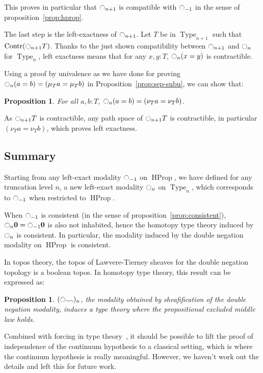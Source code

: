 \documentclass[conference]{IEEEtran}
\newtheorem{prop}[thm]{Proposition}
\DeclareMathOperator{\Type}{Type}
\DeclareMathOperator{\HProp}{HProp}
\DeclareMathOperator{\Contr}{Contr}
\newcommand{\modal}{\ensuremath{\ocircle}}
\newcommand \zero {\mathbf{0}}
\begin{document}
This proves in particular that $\modal_{n+1}$ is compatible with
$\modal_{-1}$ in the sense of proposition~\ref{prop:hprop}.

The last step is the left-exactness of $\modal_{n+1}$. Let $T$ be in
$\Type_{n+1}$ such that $\Contr(\modal_{n+1} T)$.  Thanks to the just
shown compatibility between $\modal_{n+1}$ and $\modal_n$ for
$\Type_n$, left exactness means that for any $x,y : T$,
$\modal_n(x=y)$ is contractible.

Using a proof by univalence as we have done for proving $\modal_n (a=b) = (\mu_T a =
\mu_T b)$ in Proposition~\ref{prop:sep-subu}, we can show that:
\begin{prop}
  For all $a,b:T$, $\modal_n(a=b) = (\nu_T a = \nu_T b)$.
\end{prop}

As $\modal_{n+1} T$ is contractible, any path space of $\modal_{n+1} T$ is
contractible, in particular $(\nu_T a=\nu_T b)$, which proves left
exactness. 

\subsection{Summary}
\label{ssec:summary}

Starting from any left-exact modality $\modal_{-1}$ on $\HProp$, we
have defined for any truncation level $n$, a new left-exact modality
$\modal_n$ on $\Type_n$, which corresponds to $\modal_{-1}$ when
restricted to $\HProp$.


When $\modal_{-1}$ is consistent (in the sense of
proposition~\ref{prop:consistent}), 
$\modal_{n}\zero=\modal_{-1}\zero$ is also not inhabited, hence the homotopy type theory induced by
$\modal_n$ is consistent. 
%
In particular, the modality induced by the double negation modality on
$\HProp$ is consistent.

In topos theory, the topos of Lawvere-Tierney sheaves for the double
negation topology is a boolean topos. In homotopy type theory, this
result can be expressed as:

\begin{prop}
  $(\modal_{\lnot\lnot})_n$, the modality obtained by sheafification
  of the double negation modality,
  induces a type theory where the propositional excluded middle law holds.
\end{prop}

Combined with forcing in type theory~\cite{jaber2012extending}, it
should be possible to lift the proof of independence of the continuum
hypothesis to a classical setting, which is where the continuum hypothesis is
really meaningful.  However, we haven't work out the details and left
this for future work.
\end{document}
